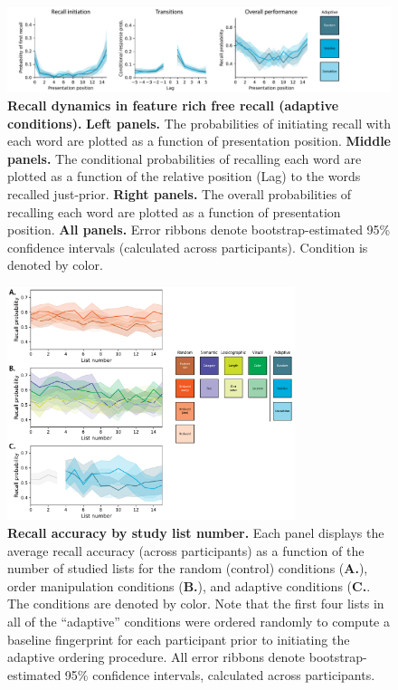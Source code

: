 \documentclass{article}
\begin{document}
\begin{figure}[p] \centering
    \includegraphics[width=\textwidth]{figures/recall_dynamics_adaptive}
    
    \caption{\textbf{Recall dynamics in feature rich free recall (adaptive conditions).} \textbf{Left panels.} The probabilities of
    initiating recall with each word are plotted as a function of presentation
    position. \textbf{Middle panels.} The conditional probabilities of recalling
    each word are plotted as a function of the relative position (Lag) to the words
    recalled just-prior. \textbf{Right panels.} The overall probabilities of
    recalling each word are plotted as a function of presentation position.
    \textbf{All panels.} Error ribbons denote bootstrap-estimated 95\% confidence
    intervals (calculated across participants). Condition is denoted by color.}
    
        \label{fig:recall-dynamics-adaptive}
    \end{figure}


\begin{figure}[tp] \centering
    \includegraphics[width=0.75\textwidth]{figures/accuracy_by_list}
    
    \caption{\textbf{Recall accuracy by study list number.}  Each panel displays the average recall accuracy (across participants) as a function of the number of studied lists for the
    random (control) conditions (\textbf{A.}), order manipulation conditions (\textbf{B.}), and adaptive conditions (\textbf{C.}.  The conditions are denoted by color.  Note that the first four
    lists in all of the ``adaptive'' conditions were ordered randomly to compute a baseline fingerprint for each participant prior to initiating the adaptive ordering procedure.  All error
    ribbons denote bootstrap-estimated 95\% confidence intervals, calculated across participants.}
        \label{fig:accuracy-by-list}
\end{figure}
\end{document}
